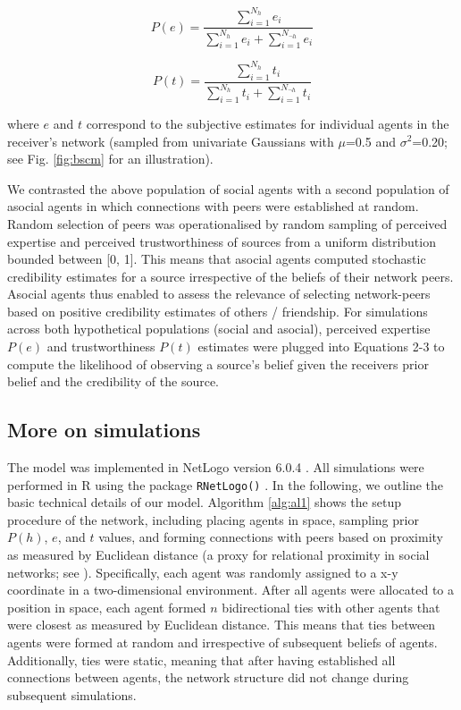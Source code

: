 \documentclass[fleqn,10pt]{wlscirep}
\begin{document}
\begin{equation}
    P(e) = \frac{\sum_{i=1}^{N_h}e_i}{\sum_{i=1}^{N_h}e_i + \sum_{i=1}^{N_{\neg h}}e_i}              
\end{equation}

\begin{equation}
    P(t) = \frac{\sum_{i=1}^{N_h}t_i}{\sum_{i=1}^{N_h}t_i + \sum_{i=1}^{N_{\neg h}}t_i}
\end{equation}

where \(e\) and \(t\) correspond to the subjective estimates for individual agents in the receiver's network (sampled from univariate Gaussians with \(\mu\)=0.5 and \(\sigma^2\)=0.20; see Fig. \ref{fig:bscm} for an illustration).


We contrasted the above population of social agents with a second population of asocial agents in which connections with peers were established at random. Random selection of peers was operationalised by random sampling of perceived expertise and perceived trustworthiness of sources from a uniform distribution bounded between [0, 1]. This means that asocial agents computed stochastic credibility estimates for a source irrespective of the beliefs of their network peers. Asocial agents thus enabled to assess  the relevance of selecting network-peers based on positive credibility estimates of others / friendship. For simulations across both hypothetical populations (social and asocial), perceived expertise \(P(e)\) and trustworthiness \(P(t)\) estimates were plugged into Equations 2-3 to compute the likelihood of observing a source's belief given the receivers prior belief and the credibility of the source.

\subsection*{More on simulations}
The model was implemented in NetLogo version 6.0.4 \cite{wilensky1999netlogo}. All simulations were performed in R using the package {\tt RNetLogo()} \cite{thiele2014r}. In the following, we outline the basic technical details of our model. Algorithm \ref{alg:al1} shows the setup procedure of the network, including placing agents in space, sampling prior \(P(h)\), \(e\), and \(t\) values, and forming connections with peers based on proximity as measured by Euclidean distance (a proxy for relational proximity in social networks; see \cite{duggins2017}). Specifically, each agent was randomly assigned to a x-y coordinate in a two-dimensional environment. After all agents were allocated to a position in space, each agent formed \(n\) bidirectional ties with other agents that were closest as measured by Euclidean distance. This means that ties between agents were formed at random and irrespective of subsequent beliefs of agents. Additionally, ties were static, meaning that after having established all connections between agents, the network structure did not change during subsequent simulations.  
\end{document}
